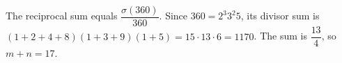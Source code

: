 The reciprocal sum equals $\dfrac{\sigma(360)}{360}$. Since $360=2^3 3^2 5$, its divisor sum is $(1+2+4+8)(1+3+9)(1+5)=15\cdot13\cdot6=1170$. The sum is $\dfrac{13}{4}$, so $\boxed{m+n=17}$.
